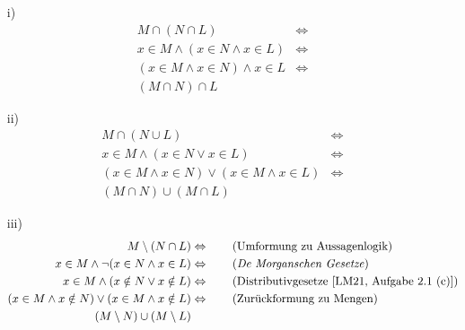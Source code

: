 \documentclass{exam}
\begin{document}
\begin{enumerate}
    \item[i)]
          \begin{align*}
              M \cap (N \cap L)                     & \Leftrightarrow \tag{Umformung zu Aussagenlogik}                \\
              x \in M \land (x \in N \land x \in L) & \Leftrightarrow \tag{Assoziativgesetze [LM21, Aufgabe 2.1 (a)]} \\
              (x \in M \land x \in N) \land x \in L & \Leftrightarrow \tag{Zurückformung zu Mengen}                   \\
              (M \cap N) \cap L
          \end{align*}
    \item[ii)]
          \begin{align*}
              M \cap (N \cup L)                                    & \Leftrightarrow \tag{Umformung zu Aussagenlogik}                 \\
              x \in M \land (x \in N \lor x \in L)                 & \Leftrightarrow \tag{Distributivgesetze [LM21, Aufgabe 2.1 (c)]} \\
              (x \in M \land x \in N) \lor (x \in M \land x \in L) & \Leftrightarrow \tag{Zurückformung zu Mengen}                    \\
              (M \cap N) \cup (M \cap L)
          \end{align*}
    \item[iii)]
          \begin{align*}
              M \setminus (N \cap L)                                     & \Leftrightarrow \tag{Umformung zu Aussagenlogik}                 \\
              x \in M \land \neg (x \in N \land x \in L)                 & \Leftrightarrow \tag{\textit{De Morganschen Gesetze}}            \\
              x \in M \land (x \notin N \lor x \notin L)                 & \Leftrightarrow \tag{Distributivgesetze [LM21, Aufgabe 2.1 (c)]} \\
              (x \in M \land x \notin N) \lor (x \in M \land x \notin L) & \Leftrightarrow \tag{Zurückformung zu Mengen}                    \\
              (M \setminus N) \cup (M \setminus L)
          \end{align*}
\end{enumerate}
\end{document}
